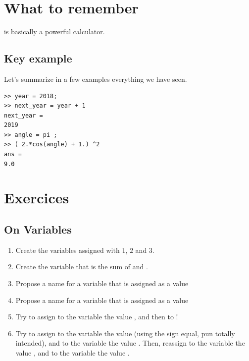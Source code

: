 \section{What to remember}
	\matlab is basically a powerful calculator.

	\subsection{Key example}
		Let's summarize in a few examples everything we have seen.
\begin{lstlisting}
>> year = 2018;
>> next_year = year + 1
next_year = 
2019
>> angle = pi ;
>> ( 2.*cos(angle) + 1.) ^2 
ans = 
9.0
\end{lstlisting}


\section{Exercices}
	\subsection{On Variables}
		\begin{enumerate}
			\item Create the variables  assigned with $1$, $2$ and $3$.
			\item Create the variable  that is the sum of  and .
			\item Propose a name for a variable that is assigned as a value 
			\item Propose a name for a variable that is assigned as a value 
			\item Try to assign to the variable  the value , and then to !
			\item Try to assign to the variable  the value  (using the sign equal, pun totally intended), and to the variable  the value .
			Then, reassign to the variable  the value , and to the variable  the value .
		\end{enumerate}


